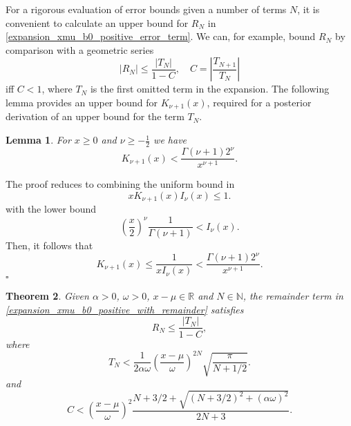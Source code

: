 \documentclass[10pt,a4paper,oneside]{article}
\newtheorem{theorem}{Theorem}[section]
\newtheorem{lemma}[theorem]{Lemma}
\newenvironment{proof}{\noindent{\bf Proof:}}{\hfill$\square$}
\numberwithin{equation}{section}
\begin{document}
For a rigorous evaluation of error bounds given a number of terms $N$, it is convenient to calculate an upper bound for $R_N$ in \eqref{expansion_xmu_b0_positive_error_term}. We can, for example, bound $R_N$ by comparison with a geometric series
\begin{equation}
\left|R_N \right| \le \frac{|T_N|}{1 - C}, \quad C = \left|\frac{T_{N+1}}{T_N}\right|
\end{equation}
iff $C < 1$, where $T_N$ is the first omitted term in the expansion. The following lemma provides an upper bound for $K_{\nu+1}(x)$, required for a posterior derivation of an upper bound for the term $T_N$.
\begin{lemma}\label{lemma_1}
For $x \ge 0$ and $\nu \ge -\frac{1}{2}$ we have
\begin{equation}
K_{\nu + 1}(x) < \frac{\Gamma(\nu + 1)2^{\nu}}{x^{\nu + 1}}.
\end{equation}
\end{lemma}
\begin{proof}
The proof reduces to combining the uniform bound in \cite{Gaunt2016}
\begin{equation}
x K_{\nu + 1}(x) I_{\nu}(x) \le 1.
\end{equation}
with the lower bound \cite{Luke1972}
\begin{equation}
\left(\frac{x}{2}\right)^{\nu}\frac{1}{\Gamma(\nu + 1)} < I_{\nu}(x).
\end{equation}
Then, it follows that
\begin{equation}
K_{\nu + 1}(x) \le \frac{1}{x I_{\nu}(x)} < \frac{\Gamma(\nu + 1)2^{\nu}}{x^{\nu + 1}}.
\end{equation}
\end{proof}

\begin{theorem}\label{theorem_expansion_xmu_b0_postivie_remainder}
Given $\alpha > 0$, $\omega > 0$, $x-\mu \in \mathbb{R}$ and $N \in \mathbb{N}$, the remainder term in \eqref{expansion_xmu_b0_positive_with_remainder} satisfies
\begin{equation}\label{bound_remainder_xmu_b0_positive}
R_N \le \frac{|T_N|}{1 - C},
\end{equation}
where
\begin{equation}\label{bound_TN_xmu_b0_positive}
T_N < \frac{1}{2\alpha\omega}\left(\frac{x-\mu}{\omega}\right)^{2N} \sqrt{\frac{\pi}{N + 1/2}}.
\end{equation}
and
\begin{equation}
C < \left(\frac{x-\mu}{\omega}\right)^2 \frac{N + 3/2 + \sqrt{(N + 3/2)^2 + (\alpha\omega)^2}}{2N + 3}.
\end{equation}
\end{theorem}
\end{document}
